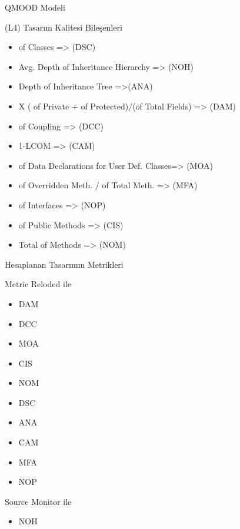\documentclass[compress,xcolor=table]{beamer}
\begin{document}
\begin{frame}{QMOOD Modeli}
\begin{block}{(L4) Tasarım Kalitesi Bileşenleri}
		
\begin{itemize}
\item of Classes => (DSC)
\item Avg. Depth of Inheritance Hierarchy => (NOH)
\item Depth of Inheritance Tree =>(ANA)
\item X ( of Private + of Protected)/(of Total Fields) => (DAM)
\item of Coupling => (DCC)
\item 1-LCOM => (CAM)
\item of Data Declarations for User Def. Classes=> (MOA)
\item of Overridden Meth. / of Total Meth. =>  (MFA)
\item of Interfaces =>  (NOP)
\item of Public Methods =>  (CIS)
\item Total of Methods =>  (NOM)






\end{itemize}

		
\end{block}
\end{frame}


\begin{frame}{Hesaplanan Tasarımın Metrikleri}
\begin{block}{Metric Reloded ile}
		
\begin{itemize}
\item DAM
\item DCC
\item MOA
\item CIS
\item NOM
\item DSC
\item ANA
\item CAM
\item MFA
\item NOP






\end{itemize}

		
\end{block}


\begin{block}{Source Monitor ile}
	
\begin{itemize}
\item NOH






\end{itemize}

		
\end{block}


\end{frame}
\end{document}

